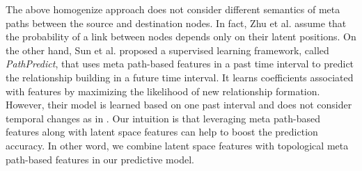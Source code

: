 The above homogenize approach does not consider different semantics of meta paths between the source and destination nodes. In fact, Zhu et al. \cite{Zhu2016} assume that the probability of a link between nodes depends only on their latent positions. On the other hand, Sun et al. \cite{sun2011ASONAM} proposed a supervised learning framework, called \textit{PathPredict}, that uses meta path-based features in a past time interval to predict the relationship building in a future time interval. It learns coefficients associated with features by maximizing the likelihood of new relationship formation. However, their model is learned based on one past interval and does not consider temporal changes as in \cite{Zhu2016}. Our intuition is that leveraging meta path-based features along with latent space features can help to boost the prediction accuracy. In other word, we combine latent space features with topological meta path-based features in our predictive model.


